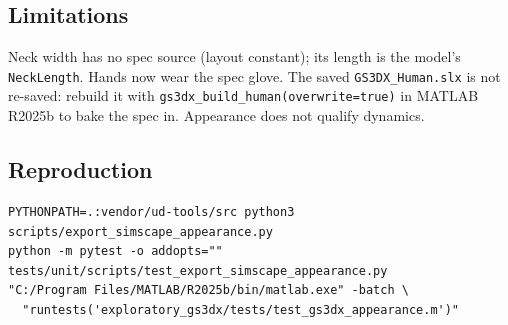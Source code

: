\subsection{Limitations}
Neck width has no spec source (layout constant); its length is the model's
\texttt{NeckLength}. Hands now wear the spec glove. The saved
\texttt{GS3DX\_Human.slx} is not re-saved: rebuild it with
\texttt{gs3dx\_build\_human(overwrite=true)} in MATLAB R2025b to bake the
spec in. Appearance does not qualify dynamics.

\subsection{Reproduction}
\begin{verbatim}
PYTHONPATH=.:vendor/ud-tools/src python3 scripts/export_simscape_appearance.py
python -m pytest -o addopts="" tests/unit/scripts/test_export_simscape_appearance.py
"C:/Program Files/MATLAB/R2025b/bin/matlab.exe" -batch \
  "runtests('exploratory_gs3dx/tests/test_gs3dx_appearance.m')"
\end{verbatim}
